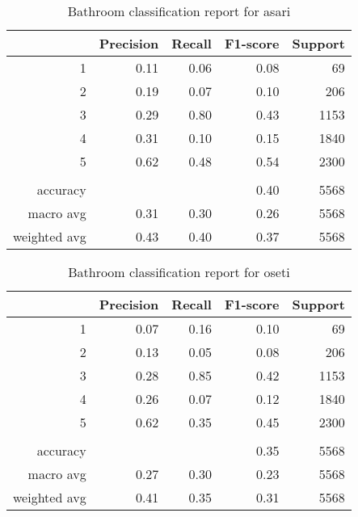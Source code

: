 \documentclass[12pt]{article}
\begin{document}
	\begin{table}
		\begin{center}
			{\renewcommand{\arraystretch}{1.5}
				\renewcommand{\tabcolsep}{0.2cm}
				\begin{tabular}{r r r r r}
					& Precision & Recall & F1-score & Support\\
					\hline
					1 & 0.11 & 0.06 & 0.08 & 69\\
					2 & 0.19 & 0.07 & 0.10 & 206\\
					3 & 0.29 & 0.80 & 0.43 & 1153\\
					4 & 0.31 & 0.10 & 0.15 & 1840\\
					5 & 0.62 & 0.48 & 0.54 & 2300\\
					& & & & \\
					accuracy & & & 0.40 & 5568\\
					macro avg & 0.31 & 0.30 & 0.26 & 5568\\
					weighted avg & 0.43 & 0.40 & 0.37 & 5568
			\end{tabular}}
		\end{center}
		\caption{Bathroom classification report for asari}
	\end{table}
	
	\begin{table}
		\begin{center}
			{\renewcommand{\arraystretch}{1.5}
				\renewcommand{\tabcolsep}{0.2cm}
				\begin{tabular}{r r r r r}
					& Precision & Recall & F1-score & Support\\
					\hline
					1 & 0.07 & 0.16 & 0.10 & 69\\
					2 & 0.13 & 0.05 & 0.08 & 206\\
					3 & 0.28 & 0.85 & 0.42 & 1153\\
					4 & 0.26 & 0.07 & 0.12 & 1840\\
					5 & 0.62 & 0.35 & 0.45 & 2300\\
					& & & & \\
					accuracy & & & 0.35 & 5568\\
					macro avg & 0.27 & 0.30 & 0.23 & 5568\\
					weighted avg & 0.41 & 0.35 & 0.31 & 5568
			\end{tabular}}
		\end{center}
		\caption{Bathroom classification report for oseti}
	\end{table}
	
\end{document}
